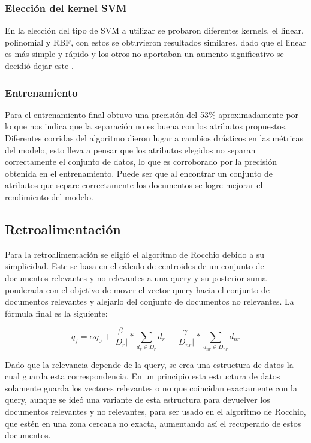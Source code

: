 \documentclass[runningheads]{llncs}
\begin{document}
\subsubsection{Elección del kernel SVM}

En la elección del tipo de SVM a utilizar se probaron diferentes kernels, el linear, polinomial y RBF, con estos
se obtuvieron resultados similares, dado que el linear es más simple y rápido y los otros no aportaban un aumento
significativo se decidió dejar este \cite{svmSklearn}.

\subsubsection{Entrenamiento}

Para el entrenamiento final obtuvo una precisión del 53\% aproximadamente por lo que nos indica que la separación no es buena con
los atributos propuestos. Diferentes corridas del algoritmo dieron lugar a cambios drásticos en las métricas del modelo, esto lleva
a pensar que los atributos elegidos no separan correctamente el conjunto de datos, lo que es corroborado por la precisión obtenida en 
el entrenamiento. Puede ser que al encontrar un conjunto de atributos que separe correctamente los documentos
se logre mejorar el rendimiento del modelo.

\subsection{Retroalimentación}

Para la retroalimentación se eligió el algoritmo de Rocchio debido a su simplicidad. Este se basa 
en el cálculo de centroides de un conjunto de documentos relevantes y no relevantes a una query
y su posterior suma ponderada con el objetivo de mover el vector query hacia el conjunto de 
documentos relevantes y alejarlo del conjunto de documentos no relevantes. La fórmula final es la siguiente:

\begin{equation}
    q_f = \alpha q_0 + \frac{\beta}{|D_r|}*\sum_{d_r \in D_r} d_r -  \frac{\gamma}{|D_{nr}|}*\sum_{d_{nr} \in D_{nr}} d_{nr} 
\end{equation}

Dado que la relevancia depende de la query, se crea una estructura de datos la cual guarda esta correspondencia. 
En un principio esta estructura de datos solamente guarda los vectores relevantes o no que coincidan exactamente
con la query, aunque se ideó una variante de esta estructura para devuelver los documentos relevantes y no
relevantes, para ser usado en el algoritmo de Rocchio, que estén en una zona cercana no exacta, aumentando así el recuperado de estos documentos.
\end{document}
